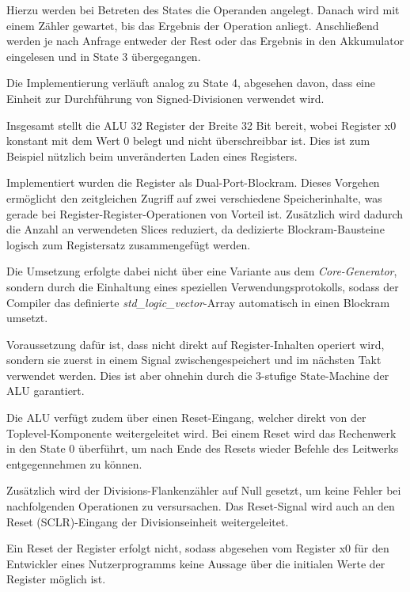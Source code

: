 Hierzu werden bei Betreten des States die Operanden angelegt. Danach wird mit einem Z\"ahler gewartet, bis das Ergebnis der Operation anliegt.
Anschlie\ss{}end werden je nach Anfrage entweder der Rest oder das Ergebnis in den Akkumulator eingelesen und in State 3 \"ubergegangen.

Die Implementierung verl\"auft analog zu State 4, abgesehen davon, dass eine Einheit zur Durchf\"uhrung von Signed-Divisionen verwendet wird.

Insgesamt stellt die ALU 32 Register der Breite 32 Bit bereit, wobei Register x0 konstant mit dem Wert 0 belegt und nicht \"uberschreibbar ist. Dies ist zum Beispiel n\"utzlich beim unver\"anderten Laden eines Registers.

Implementiert wurden die Register als Dual-Port-Blockram. Dieses Vorgehen erm\"oglicht den zeitgleichen Zugriff auf zwei verschiedene Speicherinhalte, was gerade bei Register-Register-Operationen von Vorteil ist. Zus\"atzlich wird dadurch die Anzahl an verwendeten Slices reduziert, da dedizierte Blockram-Bausteine logisch zum Registersatz zusammengef\"ugt werden.\vspace{10pt}

Die Umsetzung erfolgte dabei nicht \"uber eine Variante aus dem \textit{Core-Generator}, sondern durch die Einhaltung eines speziellen Verwendungsprotokolls, sodass der Compiler das definierte \textit{std\_logic\_vector}-Array automatisch in einen Blockram umsetzt.

Voraussetzung daf\"ur ist, dass nicht direkt auf Register-Inhalten operiert wird, sondern sie zuerst in einem Signal zwischengespeichert und im n\"achsten Takt verwendet werden. Dies ist aber ohnehin durch die 3-stufige State-Machine der ALU garantiert.

Die ALU verf\"ugt zudem \"uber einen Reset-Eingang, welcher direkt von der Toplevel-Komponente weitergeleitet wird. Bei einem Reset wird das Rechenwerk in den State 0 \"uberf\"uhrt, um nach Ende des Resets wieder Befehle des Leitwerks entgegennehmen zu k\"onnen.

Zus\"atzlich wird der Divisions-Flankenz\"ahler auf Null gesetzt, um keine Fehler bei nachfolgenden Operationen zu versursachen. Das Reset-Signal wird auch an den Reset (SCLR)-Eingang der Divisionseinheit weitergeleitet.

Ein Reset der Register erfolgt nicht, sodass abgesehen vom Register x0 f\"ur den Entwickler eines Nutzerprogramms keine Aussage \"uber die initialen Werte der Register m\"oglich ist.

\newpage
